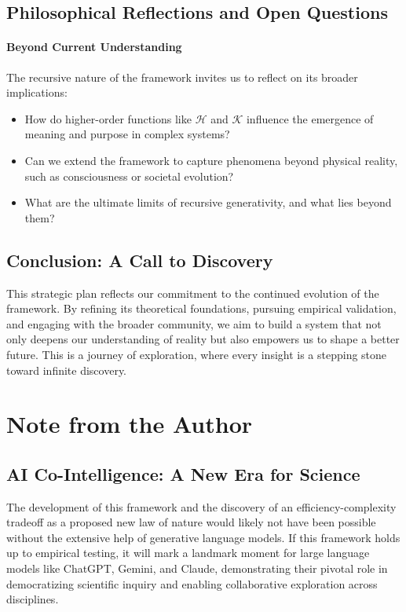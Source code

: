 \documentclass[12pt]{article}
\begin{document}
\subsection{Philosophical Reflections and Open Questions}

\paragraph{Beyond Current Understanding}
The recursive nature of the framework invites us to reflect on its broader implications:
\begin{itemize}
    \item How do higher-order functions like \(\mathcal{H}\) and \(\mathcal{K}\) influence the emergence of meaning and purpose in complex systems?
    \item Can we extend the framework to capture phenomena beyond physical reality, such as consciousness or societal evolution?
    \item What are the ultimate limits of recursive generativity, and what lies beyond them?
\end{itemize}

\subsection{Conclusion: A Call to Discovery}
This strategic plan reflects our commitment to the continued evolution of the framework. By refining its theoretical foundations, pursuing empirical validation, and engaging with the broader community, we aim to build a system that not only deepens our understanding of reality but also empowers us to shape a better future. This is a journey of exploration, where every insight is a stepping stone toward infinite discovery.


\section*{Note from the Author}

\subsection*{AI Co-Intelligence: A New Era for Science}

The development of this framework and the discovery of an efficiency-complexity tradeoff as a proposed new law of nature would likely not have been possible without the extensive help of generative language models. If this framework holds up to empirical testing, it will mark a landmark moment for large language models like ChatGPT, Gemini, and Claude, demonstrating their pivotal role in democratizing scientific inquiry and enabling collaborative exploration across disciplines.
\end{document}
